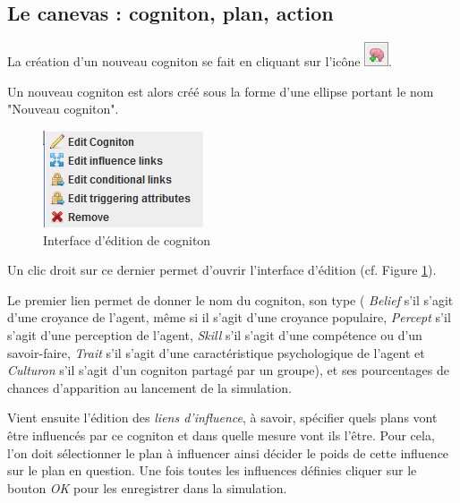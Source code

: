 \subsection{Le canevas : cogniton, plan, action}

	La création d'un nouveau cogniton se fait en cliquant sur l'icône \includegraphics{DocumentationSimulation/images/newcogni.png}. 
	
	Un nouveau cogniton est alors créé sous la forme d'une ellipse portant le nom "Nouveau cogniton". 
	
\begin{figure}[!ht]
	\begin{center}
	\includegraphics[scale=0.6]{DocumentationSimulation/images/interface.png}
	\caption[Interface]{Interface d'édition de cogniton\\}
	\label{Interface d'édition de cogniton}
	\end{center}
	\end{figure}

Un clic droit sur ce dernier permet d'ouvrir l'interface d'édition (cf. Figure \ref{Interface d'édition de cogniton}). 

Le premier lien permet de donner le nom du cogniton, son type (\textit{ Belief} s'il s'agit d'une croyance de l'agent, même si il s'agit d'une croyance populaire, \textit{Percept} s'il s'agit d'une perception de l'agent, \textit{Skill} s'il s'agit d'une compétence ou d'un savoir-faire, \textit{Trait} s'il s'agit d'une caractéristique psychologique de l'agent et \textit{Culturon} s'il s'agit d'un cogniton partagé par un groupe), et ses pourcentages de chances d'apparition au lancement de la simulation.

Vient ensuite l'édition des \textit{liens d'influence}, à savoir, spécifier quels plans vont être influencés par ce cogniton et dans quelle mesure vont ils l'être. Pour cela, l'on doit sélectionner le plan à influencer ainsi décider le poids de cette influence sur le plan en question. Une fois toutes les influences définies cliquer sur le bouton \textit{OK} pour les enregistrer dans la simulation.

